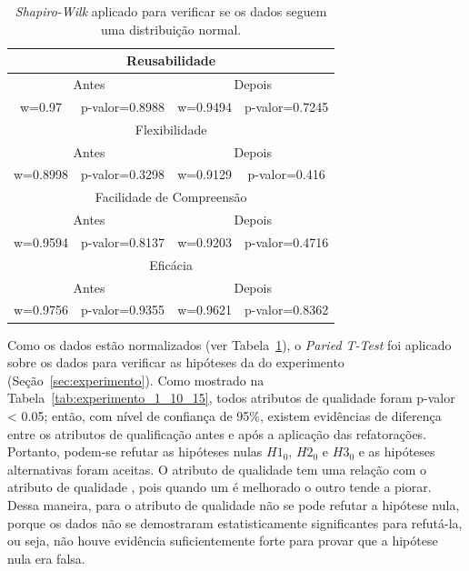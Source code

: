\begin{table}[h]
\centering
\caption{\textit{Shapiro-Wilk} aplicado para verificar se os dados seguem uma distribuição normal.}
\label{tab:shapiro_experimento_1}
\begin{tabular}{|c|c|c|c|}
\hline
\multicolumn{4}{|c|}{Reusabilidade}                       \\ \hline
\multicolumn{2}{|c|}{Antes} & \multicolumn{2}{c|}{Depois} \\ \hline
w=0.97        & p-valor=0.8988        & w=0.9494        & p-valor=0.7245        \\ \hline
\multicolumn{4}{|c|}{Flexibilidade}                       \\ \hline
\multicolumn{2}{|c|}{Antes} & \multicolumn{2}{c|}{Depois} \\ \hline
w=0.8998        & p-valor=0.3298        & w=0.9129        & p-valor=0.416        \\ \hline
\multicolumn{4}{|c|}{Facilidade de Compreensão}           \\ \hline
\multicolumn{2}{|c|}{Antes} & \multicolumn{2}{c|}{Depois} \\ \hline
w=0.9594        & p-valor=0.8137        & w=0.9203        & p-valor=0.4716         \\ \hline
\multicolumn{4}{|c|}{Eficácia}                            \\ \hline
\multicolumn{2}{|c|}{Antes} & \multicolumn{2}{c|}{Depois} \\ \hline
w=0.9756        & p-valor=0.9355         & w=0.9621        & p-valor=0.8362        \\ \hline
\end{tabular}
\end{table}

Como os dados estão normalizados (ver Tabela~\ref{tab:shapiro_experimento_1}), o \textit{Paried T-Test} foi aplicado sobre os dados para verificar as hipóteses da  do experimento (Seção~\ref{sec:experimento}). Como mostrado na Tabela~\ref{tab:experimento_1_10_15}, todos atributos de qualidade foram p-valor < 0.05; então, com nível de confiança de 95\%, existem evidências de diferença entre os atributos de qualificação antes e após a aplicação das refatorações. Portanto, podem-se refutar as hipóteses nulas \textbf{$H1_{0}$}, \textbf{$H2_{0}$} e \textbf{$H3_{0}$} e as hipóteses alternativas foram aceitas. O atributo de qualidade  tem uma relação com o atributo de qualidade , pois quando um é melhorado o outro tende a piorar. Dessa maneira, para o atributo de qualidade  não se pode refutar a hipótese nula, porque os dados não se demostraram estatisticamente significantes para refutá-la, ou seja, não houve evidência suficientemente forte para provar que a hipótese nula era falsa.


